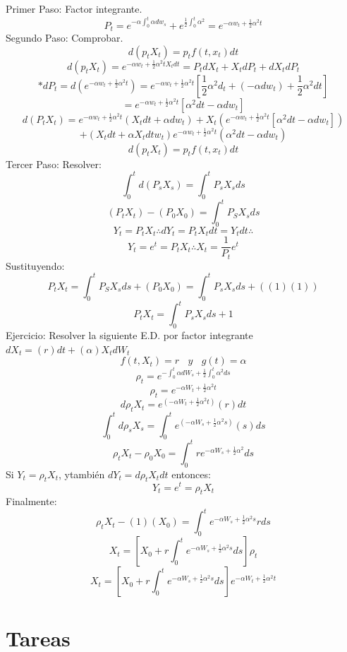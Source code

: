\documentclass[11pt,fleqn]{book} %
\numberwithin{equation}{section} %
\numberwithin{figure}{section} %
\numberwithin{table}{section} %
\begin{document}
Primer Paso: Factor integrante.
$$
P_t=e^{-\alpha \int_{0}^{t}\alpha dw_s} + e^{\frac{1}{2} \int_{0}^{t} \alpha^{2}} =e^{-\alpha w_t+\frac{1}{2}\alpha^{2}t}
$$
Segundo Paso: Comprobar.
$$d(p_tX_t)=p_tf(t,x_t)dt $$
$$d(p_tX_t)=e^{-\alpha w_t+\frac{1}{2}\alpha ^2tX_tdt}=P_tdX_t+X_tdP_t+dX_tdP_t$$
$$*dP_t=d(e^{-\alpha w_t+\frac{1}{2}\alpha ^2t})
=e^{-\alpha w_t+\frac{1}{2}\alpha ^2t}[\frac{1}{2}\alpha ^2d_t+(-\alpha dw_t)+\frac{1}{2}\alpha ^2dt]$$
$$=e^{-\alpha w_t+\frac{1}{2}\alpha ^2t}[\alpha ^2dt-\alpha dw_t]$$
$$
d(P_tX_t)=e^{-\alpha w_t+\frac{1}{2}\alpha ^2t}(X_tdt+\alpha dw_t)+X_t(e^{-\alpha w_t+\frac{1}{2}\alpha ^2t}[\alpha ^2dt-\alpha dw_t])$$
$$+(X_tdt+\alpha X_tdtw_t)e^{-\alpha w_t+\frac{1}{2}\alpha ^2t}(\alpha ^2dt-\alpha dw_t)$$
$$d(p_tX_t)=p_tf(t,x_t)dt $$
Tercer Paso: Resolver:
$$  \int_{0}^{t} d(P_{s}X_{s}) = \int_{0}^{t} P_{s}X_{s} ds  $$
$$  (P_{t}X_{t}) - (P_{0}X_{0})  = \int_{0}^{t} P_{S}X_{s} ds  $$
$$ Y_{t} = P_{t}X_{t} \therefore dY_{t} = P_{t}X_{t} dt = Y_{t}dt \therefore $$
$$ Y_{t} = e^{t} = P_{t} X_{t}  \therefore X_{t} =  \frac{1}{P_{t}} e^{t}$$
Sustituyendo:
$$ P_{t}X_{t} = \int_{0}^{t} P_{S}X_{s} ds  + (P_{0}X_{0}) = \int_{0}^{t} P_{s}X_{s} ds  + ((1)(1)) $$
$$ P_{t}X_{t} =  \int_{0}^{t} P_{s}X_{s} ds + 1 $$
Ejercicio: Resolver la siguiente E.D. por factor integrante $dX_{t} = (r)dt + (\alpha)X_{t} dW_{t} $
$$ f(t,X_{t}) = r \:\:\:\: y \:\:\:\: g(t) = \alpha $$
$$ \rho_{t} = e^{-\int_{0}^{t} \alpha dW_{s} + \frac{1}{2} \int_{0}^{t} \alpha^2 ds } $$
$$ \rho_{t} = e^ {-\alpha W_{t} + \frac{1}{2} \alpha^2 t} $$
$$ d \rho_{t} X_{t} = e^ { \left( -\alpha W_{t} + \frac{1}{2} \alpha^2 t      \right) } (r) dt $$
$$ \int_{0}^{t} d \rho_{s} X_{s} = \int_{0}^{t}  e^ {\left( -\alpha W_{s} + \frac{1}{2} \alpha^2 s \right) } (s) ds    $$
$$ \rho_{t} X_{t} - \rho_{0} X_{0} = \int_{0}^{t} r e^{- \alpha W_{s} + \frac{1}{2} \alpha ^2 } ds $$
Si $ Y_{t} = \rho_{t} X_{t} $, \:\:y\:también \: $ dY_{t} =  d \rho_{t} X_{t} dt $  entonces:
$$ Y_{t} = e^{t} = \rho_{t} X_{t} $$
Finalmente:
$$ \rho_{t} X_{t} - (1)(X_{0}) = \int_{0}^{t} e^{ -\alpha W_{s} + \frac{1}{2} \alpha ^{2} s} r ds  $$
$$ X_{t} = \left[ X_{0} + r \int_{0}^{t} e^{ -\alpha W_{s} + \frac{1}{2} \alpha ^{2} s} ds \right] \rho_{t} $$
$$ X_{t} = [ X_{0} + r \int_{0}^{t} e^{ -\alpha W_{s} + \frac{1}{2} \alpha ^{2} s} ds ] e^{-\alpha W_{t} + \frac{1}{2} \alpha^2 t} $$
\newpage
\section{Tareas}
\end{document}
